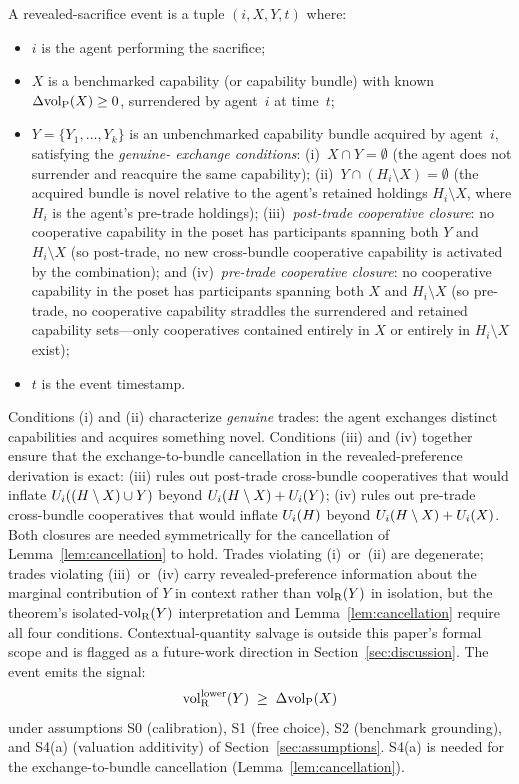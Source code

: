 \begin{definition}
\label{def:sacrifice_event}
A revealed-sacrifice event is a tuple $(i, X, Y, t)$ where:
\begin{itemize}
\item $i$ is the agent performing the sacrifice;
\item $X$ is a benchmarked capability (or capability bundle) with
  known $\Delta{\operatorname{vol}_{\mathrm{P}}}(X) \geq 0$, surrendered by agent~$i$ at
  time~$t$;
\item $Y = \{Y_1, \ldots, Y_k\}$ is an unbenchmarked capability
  bundle acquired by agent~$i$, satisfying the \emph{genuine-
  exchange conditions}:
  (i)~$X \cap Y = \emptyset$ (the agent does not surrender and
  reacquire the same capability);
  (ii)~$Y \cap (H_i \setminus X) = \emptyset$ (the acquired
  bundle is novel relative to the agent's retained holdings
  $H_i \setminus X$, where $H_i$ is the agent's pre-trade
  holdings);
  (iii)~\emph{post-trade cooperative closure}: no cooperative
  capability in the poset has participants spanning both $Y$
  and $H_i \setminus X$ (so post-trade, no new cross-bundle
  cooperative capability is activated by the combination);
  and
  (iv)~\emph{pre-trade cooperative closure}: no cooperative
  capability in the poset has participants spanning both $X$
  and $H_i \setminus X$ (so pre-trade, no cooperative
  capability straddles the surrendered and retained
  capability sets---only cooperatives contained entirely in
  $X$ or entirely in $H_i \setminus X$ exist);
\item $t$ is the event timestamp.
\end{itemize}
Conditions (i) and (ii) characterize \emph{genuine} trades: the
agent exchanges distinct capabilities and acquires something
novel.  Conditions (iii) and (iv) together ensure that the
exchange-to-bundle cancellation in the revealed-preference
derivation is exact: (iii) rules out post-trade cross-bundle
cooperatives that would inflate $U_i((H \setminus X) \cup Y)$
beyond $U_i(H \setminus X) + U_i(Y)$; (iv) rules out pre-trade
cross-bundle cooperatives that would inflate $U_i(H)$ beyond
$U_i(H \setminus X) + U_i(X)$.  Both closures are needed
symmetrically for the cancellation of
Lemma~\ref{lem:cancellation} to hold.  Trades violating
(i)~or~(ii) are degenerate; trades violating (iii)~or~(iv) carry
revealed-preference information about the marginal contribution
of $Y$ in context rather than ${\operatorname{vol}_{\mathrm{R}}}(Y)$ in isolation, but the
theorem's isolated-${\operatorname{vol}_{\mathrm{R}}}(Y)$ interpretation and
Lemma~\ref{lem:cancellation} require all four conditions.
Contextual-quantity salvage is outside this paper's formal
scope and is flagged as a future-work direction in
Section~\ref{sec:discussion}.
The event emits the signal:
\[
  {\operatorname{vol}_{\mathrm{R}}^{\mathrm{lower}}}(Y) \;\geq\; \Delta{\operatorname{vol}_{\mathrm{P}}}(X)
\]
under assumptions S0 (calibration), S1 (free choice), S2
(benchmark grounding), and S4(a) (valuation additivity) of
Section~\ref{sec:assumptions}.  S4(a) is needed for the
exchange-to-bundle cancellation
(Lemma~\ref{lem:cancellation}).
\end{definition}

